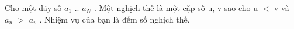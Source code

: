 Cho một dãy số $a_{1}$   .. $a_{N}$   . Một nghịch thế là một cặp số u, v sao cho u $<$ v và $a_{u}$   $>$ $a_{v}$   . Nhiệm vụ của bạn là đếm số nghịch thế.